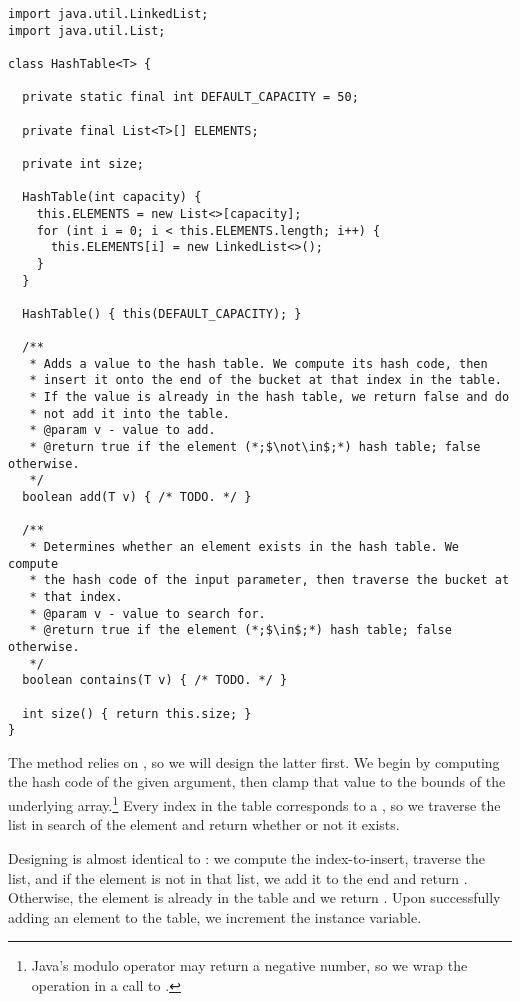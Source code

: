 \enlargethispage{-3\baselineskip}
\begin{lstlisting}[language=MyJava]
import java.util.LinkedList;
import java.util.List;

class HashTable<T> {

  private static final int DEFAULT_CAPACITY = 50;

  private final List<T>[] ELEMENTS;

  private int size;

  HashTable(int capacity) {
    this.ELEMENTS = new List<>[capacity];
    for (int i = 0; i < this.ELEMENTS.length; i++) {
      this.ELEMENTS[i] = new LinkedList<>();
    }
  }

  HashTable() { this(DEFAULT_CAPACITY); }

  /**
   * Adds a value to the hash table. We compute its hash code, then 
   * insert it onto the end of the bucket at that index in the table. 
   * If the value is already in the hash table, we return false and do 
   * not add it into the table.
   * @param v - value to add.
   * @return true if the element (*;$\not\in$;*) hash table; false otherwise.
   */
  boolean add(T v) { /* TODO. */ }

  /**
   * Determines whether an element exists in the hash table. We compute 
   * the hash code of the input parameter, then traverse the bucket at 
   * that index.
   * @param v - value to search for.
   * @return true if the element (*;$\in$;*) hash table; false otherwise.
   */
  boolean contains(T v) { /* TODO. */ }

  int size() { return this.size; }
}
\end{lstlisting}

The  method relies on , so we will design the latter first. We begin by computing the hash code of the given argument, then clamp that value to the bounds of the underlying array.\footnote{Java's modulo operator may return a negative number, so we wrap the operation in a call to .} Every index in the table corresponds to a , so we traverse the list in search of the element and return whether or not it exists.

Designing  is almost identical to : we compute the index-to-insert, traverse the list, and if the element is not in that list, we add it to the end and return . Otherwise, the element is already in the table and we return . Upon successfully adding an element to the table, we increment the  instance variable.

